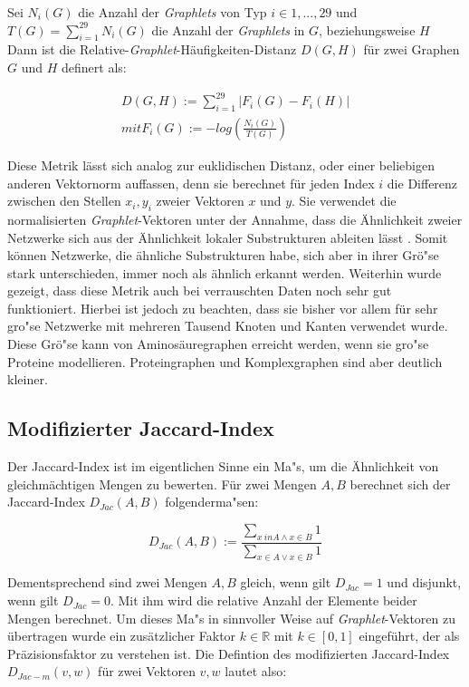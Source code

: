 \documentclass{report}
\begin{document}
Sei $N_{i}(G)$ die Anzahl der \textit{Graphlets} von Typ $i \in {1,...,29}$ und \\ $T(G) = \sum_{i = 1}^{29} N_{i}(G)$ die Anzahl der \textit{Graphlets} in $G$, beziehungsweise $H$\\

Dann ist die Relative-\textit{Graphlet}-H\"aufigkeiten-Distanz $D(G,H)$ f\"ur zwei Graphen $G$ und $H$ definert als:

\begin{subequations}
\begin{align}
D(G,H) := \sum_{i = 1}^{29} | F_{i}(G) - F_{i}(H) | \\
mit F_{i}(G) := - log(\frac{N_{i}(G)}{T(G)})
\end{align}
\end{subequations}



Diese Metrik l\"asst sich analog zur euklidischen Distanz, oder einer beliebigen anderen Vektornorm auffassen, denn sie berechnet f\"ur jeden Index $i$ die Differenz zwischen den Stellen $x_i,y_i$ zweier Vektoren $x$ und $y$. Sie verwendet die normalisierten \textit{Graphlet}-Vektoren unter der Annahme, dass die \"Ahnlichkeit zweier Netzwerke sich aus der \"Ahnlichkeit lokaler Substrukturen ableiten l\"asst \cite{frqdistribution}. Somit k\"onnen Netzwerke, die \"ahnliche Substrukturen habe, sich aber in ihrer Gr\"o"se stark unterschieden, immer noch als \"ahnlich erkannt werden.
Weiterhin wurde gezeigt, \cite{frqdistribution} dass diese Metrik auch bei verrauschten Daten noch sehr gut funktioniert. Hierbei ist jedoch zu beachten, dass sie bisher vor allem f\"ur sehr gro"se Netzwerke mit mehreren Tausend Knoten und Kanten verwendet wurde. Diese Gr\"o"se kann von Aminos\"auregraphen erreicht werden, wenn sie gro"se Proteine modellieren. Proteingraphen und Komplexgraphen sind aber deutlich kleiner.


\subsection{Modifizierter Jaccard-Index}

Der Jaccard-Index ist im eigentlichen Sinne ein Ma"s, um die \"Ahnlichkeit von gleichm\"achtigen Mengen zu bewerten. F\"ur zwei Mengen $A,B$ berechnet sich der Jaccard-Index $D_{Jac}(A,B)$ folgenderma"sen:

\[ D_{Jac}(A,B) := \frac{\sum_{x \ in A \land x \in B} 1}{\sum_{x \in A \lor x \in B} 1} \]

Dementsprechend sind zwei Mengen $A,B$ gleich, wenn  gilt $D_{Jac} = 1$ und disjunkt, wenn gilt $D_{Jac} = 0$. Mit ihm wird die relative Anzahl der Elemente beider Mengen berechnet.
Um dieses Ma"s in sinnvoller Weise auf \textit{Graphlet}-Vektoren zu \"ubertragen wurde ein zus\"atzlicher Faktor $k \in \mathbb{R} $ mit $k \in [0,1]$  eingef\"uhrt, der als Pr\"azisionsfaktor zu verstehen ist. Die Defintion des modifizierten Jaccard-Index $D_{Jac-m}(v,w)$ f\"ur zwei Vektoren $v,w$ lautet also:
\end{document}
